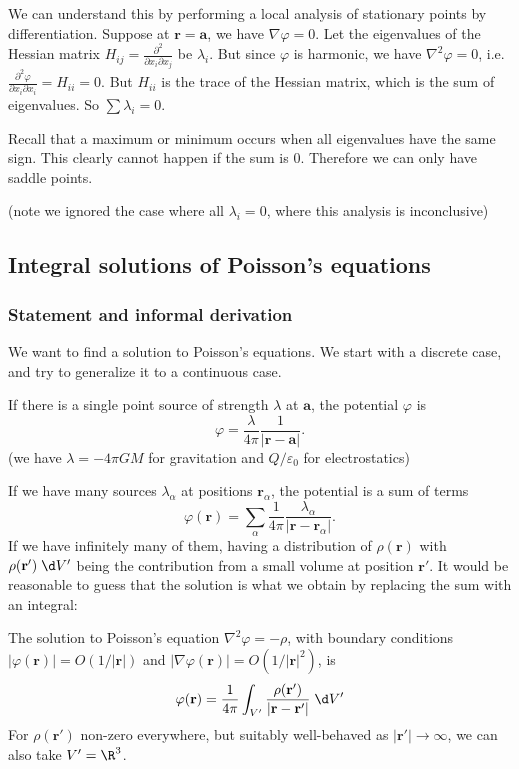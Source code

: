 \documentclass[a4paper]{article}
\begin{document}
We can understand this by performing a local analysis of stationary points by differentiation. Suppose at $\mathbf{r} = \mathbf{a}$, we have $\nabla\varphi = 0$. Let the eigenvalues of the Hessian matrix $H_{ij} = \frac{\partial^2}{\partial x_i \partial x_j}$ be $\lambda_i$. But since $\varphi$ is harmonic, we have $\nabla^2 \varphi = 0$, i.e.\ $\frac{\partial^2\varphi}{\partial x_i\partial x_i} = H_{ii} = 0$. But $H_{ii}$ is the trace of the Hessian matrix, which is the sum of eigenvalues. So $\sum \lambda_i = 0$.

Recall that a maximum or minimum occurs when all eigenvalues have the same sign. This clearly cannot happen if the sum is 0. Therefore we can only have saddle points.

(note we ignored the case where all $\lambda_i = 0$, where this analysis is inconclusive)
\subsection{Integral solutions of Poisson's equations}
\subsubsection{Statement and informal derivation}
We want to find a solution to Poisson's equations. We start with a discrete case, and try to generalize it to a continuous case.

If there is a single point source of strength $\lambda$ at $\mathbf{a}$, the potential $\varphi$ is
\[
  \varphi = \frac{\lambda}{4\pi} \frac{1}{|\mathbf{r} - \mathbf{a}|}.
\]
(we have $\lambda = -4\pi GM$ for gravitation and $Q/\varepsilon_0$ for electrostatics)

If we have many sources $\lambda_\alpha$ at positions $\mathbf{r}_\alpha$, the potential is a sum of terms
\[
  \varphi(\mathbf{r}) = \sum_{\alpha} \frac{1}{4\pi}\frac{\lambda_\alpha}{|\mathbf{r} - \mathbf{r}_\alpha|}.
\]
If we have infinitely many of them, having a distribution of $\rho(\mathbf{r})$ with $\rho(\mathbf{r}')\;\d V'$ being the contribution from a small volume at position $\mathbf{r}'$. It would be reasonable to guess that the solution is what we obtain by replacing the sum with an integral:

\begin{prop}
  The solution to Poisson's equation $\nabla^2 \varphi = -\rho$, with boundary conditions $|\varphi (\mathbf{r})| = O(1/|\mathbf{r}|)$ and $|\nabla\varphi(\mathbf{r})| = O(1/|\mathbf{r}|^2)$, is
  \[
    \varphi(\mathbf{r}) = \frac{1}{4\pi}\int_{V'} \frac{\rho(\mathbf{r}')}{|\mathbf{r} - \mathbf{r}'|}\;\d V'
  \]
  For $\rho(\mathbf{r}')$ non-zero everywhere, but suitably well-behaved as $|\mathbf{r}'| \to \infty$, we can also take $V' = \R^3$.
\end{prop}
\end{document}
